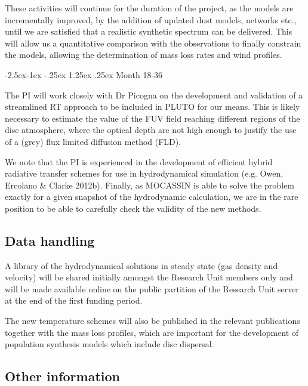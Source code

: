 \documentclass[10pt,fleqn,twoside]{article}
\makeatletter
\newcommand{\Tcol}{\color{blue}}
\renewcommand\paragraph{\@startsection{paragraph}{4}{\z@}%
            {-2.5ex\@plus -1ex \@minus -.25ex}%
            {1.25ex \@plus .25ex}%
            {\normalfont\normalsize\bfseries}}
\makeatother
\begin{document}
These activities will continue for the duration of the project, as the
models are incrementally improved, by the addition of updated dust
models, networks etc., until we are satisfied that a realistic
synthetic spectrum can be delivered. This will allow us a quantitative
comparison with the observations to finally constrain the models,
allowing the determination of mass loss rates and wind profiles. 

\paragraph{Month 18-36}

The PI will work closely with Dr Picogna on the development and
validation of a streamlined RT approach to be included in PLUTO for
our means. This is likely necessary to estimate the value of the  FUV field
reaching different regions of the disc atmosphere, where the optical
depth are not high enough to justify the use of a  (grey) flux
limited diffusion method (FLD). 

We note that the PI is experienced in the development of efficient hybrid radiative
transfer schemes for use in hydrodynamical simulation (e.g. Owen,
Ercolano \& Clarke 2012b). 
Finally, as MOCASSIN is able
to solve the problem exactly for a given snapshot of the hydrodynamic
calculation, we are in the rare position to be able to carefully
check the validity of the new methods.  

\subsection{\Tcol Data handling}

A library of the hydrodynamical solutions in steady state (gas density
and velocity)  will be shared initially amongst the Research Unit
members only and will be made available online on the public partition
of the Research Unit server at the end of the first funding period. 

The new temperature schemes will also be published in the relevant
publications together with the mass loss profiles, which are important
for the development of population synthesis models which include disc
dispersal. 

\subsection{\Tcol Other information}
\end{document}
